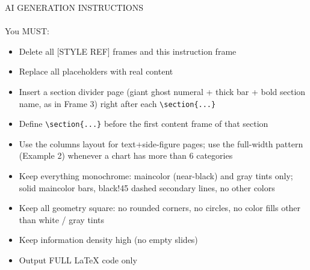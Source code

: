 \documentclass[aspectratio=169,10pt,xcolor=table]{beamer}
\begin{document}
\begin{frame}[allowframebreaks]{AI GENERATION INSTRUCTIONS}
\framesubtitle{}
You MUST:
\begin{itemize}
\item Delete all [STYLE REF] frames and this instruction frame
\item Replace all placeholders with real content
\item Insert a section divider page (giant ghost numeral + thick bar + bold
      section name, as in Frame 3) right after each \texttt{\textbackslash section\{...\}}
\item Define \texttt{\textbackslash section\{...\}} before the first content frame of that section
\item Use the columns layout for text+side-figure pages; use the full-width
      pattern (Example 2) whenever a chart has more than 6 categories
\item Keep everything monochrome: maincolor (near-black) and gray tints only;
      solid maincolor bars, black!45 dashed secondary lines, no other colors
\item Keep all geometry square: no rounded corners, no circles, no color fills
      other than white / gray tints
\item Keep information density high (no empty slides)
\item Output FULL LaTeX code only
\end{itemize}
\end{frame}

\QApage
\end{document}
